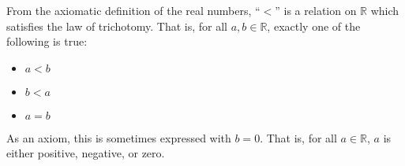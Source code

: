 \documentclass[12pt]{article}
\newcommand{\R}{\mathbb{R}} %
\begin{document}
From the axiomatic definition of the real numbers, ``$<$'' is a relation on
$\R$ which satisfies the law of trichotomy. That is, for all $a,b\in\R$,
exactly one of the following is true:
\begin{itemize}
\item $a<b$
\item $b<a$
\item $a=b$
\end{itemize}
As an axiom, this is sometimes expressed with $b=0$. That is, for all $a\in\R$, $a$ is either positive, negative, or zero.
\end{document}
